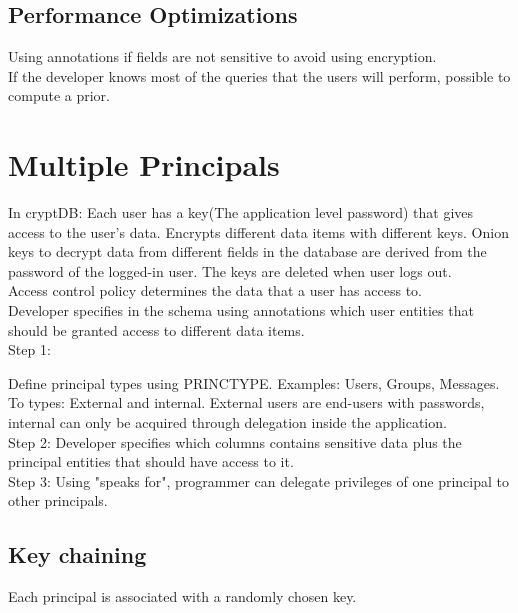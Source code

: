 \documentclass[10pt]{article}
\begin{document}
\subsection{Performance Optimizations}
Using annotations if fields are not sensitive to avoid using encryption.\\
If the developer knows most of the queries that the users will perform, possible to compute a prior.\\

\section{Multiple Principals}

In cryptDB: Each user has a key(The application level password) that gives access to the user's data. Encrypts different data items with different keys. Onion keys to decrypt data from different fields in the database are derived from the password of the logged-in user. The keys are deleted when user logs out.\\

Access control policy determines the data that a user has access to.\\

Developer specifies in the schema using annotations which user entities that should be granted access to different data items.\\


Step 1:

Define principal types using PRINCTYPE. Examples: Users, Groups, Messages.
To types: External and internal. External users are end-users with passwords, internal can only be acquired through delegation inside the application.\\

Step 2:
Developer specifies which columns contains sensitive data plus the principal entities that should have access to it.\\

Step 3:
Using "speaks for", programmer can delegate privileges of one principal to other principals.\\


\subsection{Key chaining}
Each principal is associated with a randomly chosen key. 
\end{document}
